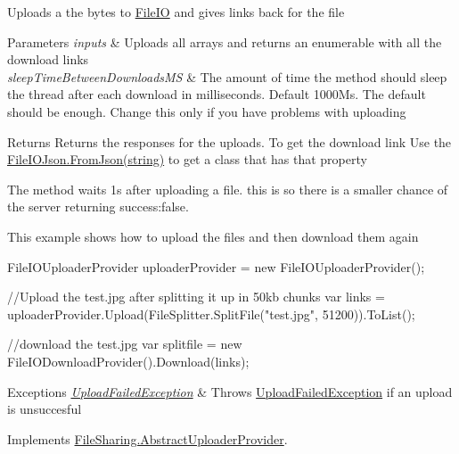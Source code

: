 Uploads a the bytes to \hyperlink{namespace_file_sharing_1_1_file_i_o}{File\+IO} and gives links back for the file 


\begin{DoxyParams}{Parameters}
{\em inputs} & Uploads all arrays and returns an enumerable with all the download links\\
\hline
{\em sleep\+Time\+Between\+Downloads\+MS} & The amount of time the method should sleep the thread after each download in milliseconds. Default 1000\+Ms. The default should be enough. Change this only if you have problems with uploading \\
\hline
\end{DoxyParams}
\begin{DoxyReturn}{Returns}
Returns the responses for the uploads. To get the download link Use the \hyperlink{class_file_sharing_1_1_file_i_o_1_1_file_i_o_json_a7e8f33aa7c9d66c387fda361fb6c5039}{File\+I\+O\+Json.\+From\+Json(string)} to get a class that has that property
\end{DoxyReturn}


The method waits 1s after uploading a file. this is so there is a smaller chance of the server returning success\+:false. 

This example shows how to upload the files and then download them again 
\begin{DoxyCode}
FileIOUploaderProvider uploaderProvider = \textcolor{keyword}{new} FileIOUploaderProvider();

\textcolor{comment}{//Upload the test.jpg after splitting it up in 50kb chunks}
var links = uploaderProvider.Upload(FileSplitter.SplitFile(\textcolor{stringliteral}{"test.jpg"}, 51200)).ToList();

\textcolor{comment}{//download the test.jpg}
var splitfile = \textcolor{keyword}{new} FileIODownloadProvider().Download(links);
\end{DoxyCode}
 


\begin{DoxyExceptions}{Exceptions}
{\em \hyperlink{class_file_sharing_1_1_upload_failed_exception}{Upload\+Failed\+Exception}} & Throws \hyperlink{class_file_sharing_1_1_upload_failed_exception}{Upload\+Failed\+Exception} if an upload is unsuccesful \\
\hline
\end{DoxyExceptions}


Implements \hyperlink{class_file_sharing_1_1_abstract_uploader_provider_a951930bd16d0cfd061fa2dfd055e2601}{File\+Sharing.\+Abstract\+Uploader\+Provider}.



